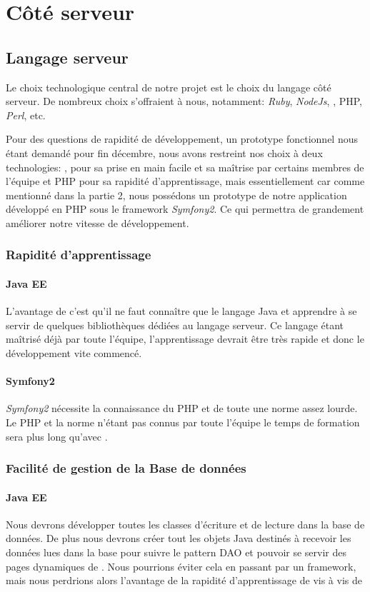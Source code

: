 \section{Côté serveur}

\subsection{Langage serveur}
Le choix technologique central de notre projet est le choix du langage côté serveur. De nombreux choix s'offraient à nous, notamment: \textit{Ruby}, \textit{NodeJs}, \jee, PHP, \textit{Perl}, etc.

Pour des questions de rapidité de développement, un prototype fonctionnel nous étant demandé pour fin décembre, nous avons restreint nos choix à deux technologies: \jee, pour sa prise en main facile et sa maîtrise par certains membres de l'équipe et PHP pour sa rapidité d'apprentissage, mais essentiellement car comme mentionné dans la partie 2, nous possédons un prototype de notre application développé en PHP sous le framework \textit{Symfony2}. Ce qui permettra de grandement améliorer notre vitesse de développement.\\


\subsubsection{Rapidité d'apprentissage}
\paragraph{Java EE}
L'avantage de \jee c'est qu'il ne faut connaître que le langage Java et apprendre à se servir de quelques bibliothèques dédiées au langage serveur.
Ce langage étant maîtrisé déjà par toute l'équipe, l'apprentissage devrait être très rapide et donc le développement vite commencé.

\paragraph{Symfony2}
\textit{Symfony2} nécessite la connaissance du PHP et de toute une norme assez lourde. 
Le PHP et la norme n'étant pas connus par toute l'équipe le temps de formation sera plus long qu'avec \jee.

\subsubsection{Facilité de gestion de la Base de données}
\paragraph{Java EE}
Nous devrons développer toutes les classes d'écriture et de lecture dans la base de données. De plus nous devrons créer tout les objets Java destinés à recevoir les données lues dans la base pour suivre le pattern DAO et pouvoir se servir des pages dynamiques de \jee.
Nous pourrions éviter cela en passant par un framework, mais nous perdrions alors l'avantage de la rapidité d'apprentissage de \jee vis à vis de \symfony

